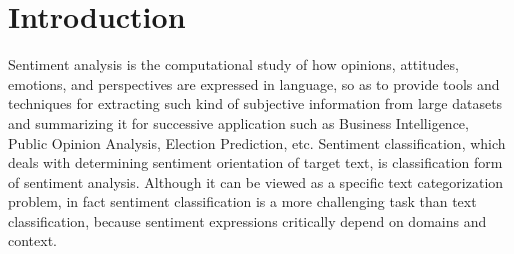 \documentclass{llncs}
\begin{document}
\section{Introduction}
Sentiment analysis is the computational study of how opinions, attitudes, emotions, 
and perspectives are expressed in language, so as to provide tools and techniques for 
extracting such kind of subjective information from large datasets and summarizing 
it for successive application such as Business Intelligence, Public Opinion Analysis, Election 
Prediction, etc\cite{xsongx:b1}. 
Sentiment classification, which deals with determining sentiment orientation of target text, is classification form of sentiment analysis\cite{xsongx:b2}. 
Although it can be viewed as a specific text categorization problem, in fact sentiment classification is a more challenging task than text classification, because sentiment expressions critically depend on domains and context\cite{xsongx:b6}.
\end{document}
